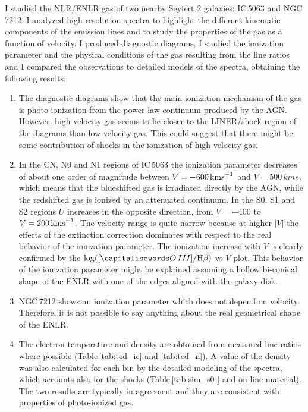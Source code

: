 \documentclass[../main.tex]{subfiles}
\begin{document}
I studied the NLR/ENLR gas of two nearby Seyfert 2 galaxies: IC\,5063 and NGC\,7212.
I analyzed high resolution spectra to highlight the different kinematic components of the emission lines and to study the properties of the gas as a function of velocity.
I produced diagnostic diagrams, I studied the ionization parameter and the physical conditions
of the gas resulting from the line ratios and I compared the observations to detailed models of the spectra, obtaining the following results: 

\begin{enumerate}
\item The diagnostic diagrams show that the main ionization mechanism of the gas is photo-ionization from the power-law continuum produced by the AGN.
However, high velocity gas seems to lie closer to the LINER/shock region of the diagrams than low velocity gas. 
This could suggest that there might be some contribution of shocks in the ionization of high velocity gas.

\item In the CN, N0 and N1 regions of IC\,5063 the ionization parameter decreases of about one order of magnitude between $V=-600\,\si{\kms}$ and $V=500\,\si{kms}$, which means that the blueshifted gas is irradiated directly by the AGN, while the redshifted gas is ionized by an attenuated continuum.
In the S0, S1 and S2 regions $U$ increases in the opposite direction, from $V=-400$ to $V=200\,\si{\kms}$.
The velocity range is quite narrow because at higher $\lvert V \rvert$ the effects of the extinction correction dominates with respect to the real behavior of the ionization parameter.
The ionization increase with $V$ is clearly confirmed by the $\log([\ion{O}{III}]/\Hb)$ vs $V$ plot.
This behavior of the ionization parameter might be explained assuming a hollow bi-conical shape of the ENLR with one of the edges aligned with the galaxy disk.

\item NGC\,7212 shows an ionization parameter which does not depend on velocity.
Therefore, it is not possible to say anything about the real geometrical shape of the ENLR.

\item The electron temperature and density are obtained from measured line ratios where possible (Table\,\ref{tab:ted_ic} and \ref{tab:ted_n}).
A value of the density was also calculated for each bin by the detailed modeling of the spectra, which accounts also for the shocks (Table\,\ref{tab:sim_s0-} and on-line material).
The two results are typically in agreement and they are consistent with properties of photo-ionized gas.


\end{enumerate}
\end{document}

